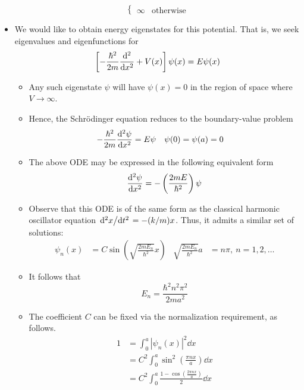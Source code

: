 \documentclass[../notes.tex]{subfiles}
\begin{document}
\begin{itemize}
\begin{equation*}
\begin{cases}
            \infty & \text{otherwise}
        \end{cases}
    \end{equation*}
    \item We would like to obtain energy eigenstates for this potential. That is, we seek eigenvalues and eigenfunctions for
    \begin{equation*}
        \left[ -\frac{\hbar^2}{2m}\dv[2]{x}+V(x) \right]\psi(x) = E\psi(x)
    \end{equation*}
    \begin{itemize}
        \item Any such eigenstate $\psi$ will have $\psi(x)=0$ in the region of space where $V\to\infty$.
        \item Hence, the Schr\"{o}dinger equation reduces to the boundary-value problem
        \begin{align*}
            -\frac{\hbar^2}{2m}\dv[2]{\psi}{x} &= E\psi&
            \psi(0) &= \psi(a) = 0
        \end{align*}
        \item The above ODE may be expressed in the following equivalent form
        \begin{equation*}
            \dv[2]{\psi}{x} = -\left( \frac{2mE}{\hbar^2} \right)\psi
        \end{equation*}
        \item Observe that this ODE is of the same form as the classical harmonic oscillator equation $\dv*[2]{x}{t}=-(k/m)x$. Thus, it admits a similar set of solutions:
        \begin{align*}
            \psi_n(x) &= C\sin(\sqrt{\frac{2mE_n}{\hbar^2}}x)&
            \sqrt{\frac{2mE_n}{\hbar^2}}a &= n\pi,\ n=1,2,\dots
        \end{align*}
        \item It follows that
        \begin{equation*}
            E_n = \frac{\hbar^2n^2\pi^2}{2ma^2}
        \end{equation*}
        \item The coefficient $C$ can be fixed via the normalization requirement, as follows.
        \begin{align*}
            1 &= \int_0^a|\psi_n(x)|^2\dd{x}\\
            &= C^2\int_0^a\sin^2\left( \frac{\pi nx}{a} \right)\dd{x}\\
            &= C^2\int_0^a\frac{1-\cos(\frac{2\pi nx}{a})}{2}\dd{x}\\

\end{align*}
\end{itemize}
\end{itemize}
\end{document}

